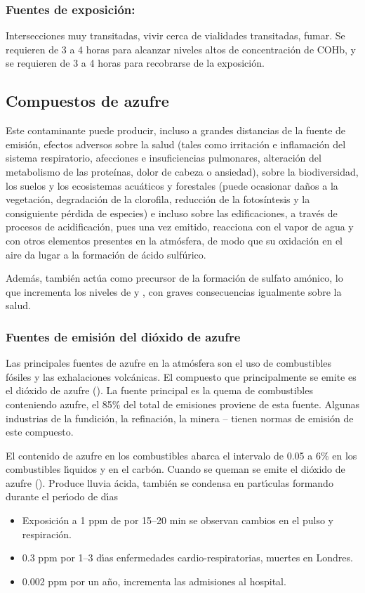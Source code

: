 \subsubsection{Fuentes de exposici\'on:}
Intersecciones muy transitadas, vivir cerca de vialidades transitadas, fumar.
Se requieren de 3 a 4 horas para alcanzar niveles altos de concentraci\'on de COHb, y
se requieren de 3 a 4 horas para recobrarse de la exposici\'on.

\subsection{Compuestos de azufre}
Este contaminante puede producir, incluso a grandes distancias de la fuente de emisión, efectos adversos sobre la salud (tales como irritación e inflamación del sistema respiratorio, afecciones e insuficiencias pulmonares, alteración del metabolismo de las proteínas, dolor de cabeza o ansiedad), sobre la biodiversidad, los suelos y los ecosistemas acuáticos y forestales (puede ocasionar daños a la vegetación, degradación de la clorofila, reducción de la fotosíntesis y la consiguiente pérdida de especies) e incluso sobre las edificaciones, a través de procesos de acidificación, pues una vez emitido, reacciona con el vapor de agua y con otros elementos presentes en la atmósfera, de modo que su oxidación en el aire da lugar a la formación de ácido sulfúrico.

Además, también actúa como precursor de la formación de sulfato amónico, lo que incrementa los niveles de  y , con graves consecuencias igualmente sobre la salud.

\subsubsection{Fuentes de emisión del dióxido de azufre} Las principales fuentes de azufre en la atmósfera son el uso de combustibles fósiles y las exhalaciones volcánicas. El compuesto que principalmente se emite es el dióxido de azufre (). La fuente   principal es la quema de combustibles conteniendo azufre, el 85\% del total de emisiones proviene de esta fuente. Algunas industrias de la fundici\'on, la refinaci\'on, la minera --  tienen normas de emisión de este compuesto.

El contenido de azufre en los combustibles abarca el intervalo de 0.05 a 6\% en los combustibles l\'{\i}quidos y en el carb\'on. Cuando se queman se emite el di\'oxido de azufre ().
Produce lluvia \'acida, tambi\'en se condensa en part\'{\i}culas formando  durante el per\'{\i}odo de d\'{\i}as
\begin{itemize}
\item Exposici\'on a 1 ppm de  por 15--20 min se observan cambios en el pulso y
respiraci\'on.
\item 0.3 ppm por 1--3 d\'{\i}as enfermedades cardio-respiratorias, muertes en Londres.
\item 0.002 ppm por un a\~no, incrementa las admisiones al hospital.
\end{itemize}

